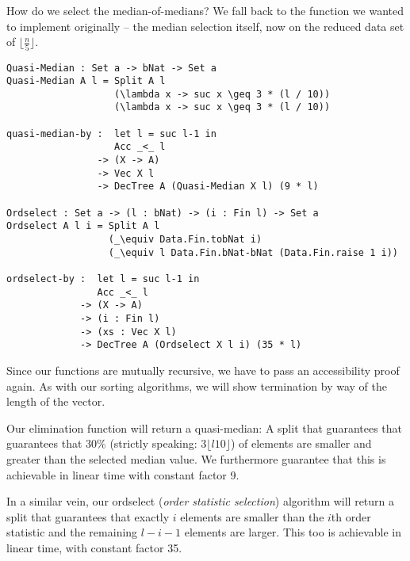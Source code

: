 How do we select the median-of-medians? We fall back to the function we wanted to implement originally -- the median selection itself, now on the reduced data set of $\lfloor \frac n 5 \rfloor$.

\begin{lstlisting}[caption={Quasi-Median},label={lst:median:quasimedian},emph={Quasi,Median,quasi,median,by,ordselect,Ordselect}]
Quasi-Median : Set a -> bNat -> Set a
Quasi-Median A l = Split A l
                   (\lambda x -> suc x \geq 3 * (l / 10))
                   (\lambda x -> suc x \geq 3 * (l / 10))

quasi-median-by :  let l = suc l-1 in
                   Acc _<_ l
                -> (X -> A)
                -> Vec X l
                -> DecTree A (Quasi-Median X l) (9 * l)

Ordselect : Set a -> (l : bNat) -> (i : Fin l) -> Set a
Ordselect A l i = Split A l
                  (_\equiv Data.Fin.tobNat i)
                  (_\equiv l Data.Fin.bNat-bNat (Data.Fin.raise 1 i))

ordselect-by :  let l = suc l-1 in
                Acc _<_ l
             -> (X -> A)
             -> (i : Fin l)
             -> (xs : Vec X l)
             -> DecTree A (Ordselect X l i) (35 * l)
\end{lstlisting}

Since our functions are mutually recursive, we have to pass an accessibility proof again. As with our sorting algorithms, we will show termination by way of the length of the vector.

Our elimination function will return a quasi-median: A split that guarantees that guarantees that 30\% (strictly speaking: $3\lfloor l {10}\rfloor$) of elements are smaller and greater than the selected median value. We furthermore guarantee that this is achievable in linear time with constant factor 9.

In a similar vein, our ordselect (\emph{order statistic selection}) algorithm will return a split that guarantees that exactly $i$ elements are smaller than the $i$th order statistic and the remaining $l - i - 1$ elements are larger. This too is achievable in linear time, with constant factor 35.

